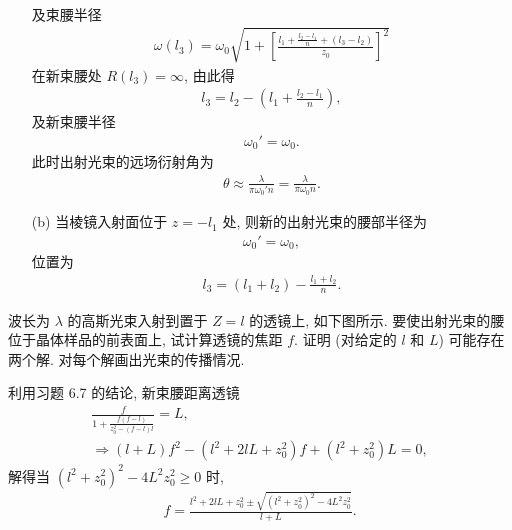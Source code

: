 \documentclass{note}
\begin{document}
\begin{sol}
\begin{itemize}
\begin{align}
        \end{align}
        及束腰半径
        \begin{align}
            \omega(l_3)=\omega_0\sqrt{1+\left[\frac{l_1+\frac{l_2-l_1}{n}+(l_3-l_2)}{z_0}\right]^2}
        \end{align}
        在新束腰处 $R(l_3)=\infty$, 由此得
        \begin{align}
            l_3=l_2-\left(l_1+\frac{l_2-l_1}{n}\right),
        \end{align}
        及新束腰半径
        \begin{align}
            \omega_0'=\omega_0.
        \end{align}
        此时出射光束的远场衍射角为
        \begin{align}
            \theta\approx\frac{\lambda}{\pi\omega_0'n}=\frac{\lambda}{\pi\omega_0n}.
        \end{align}
        \item[(b)] 当棱镜入射面位于 $z=-l_1$ 处, 则新的出射光束的腰部半径为
        \begin{align}
            \omega_0'=\omega_0,
        \end{align}
        位置为
        \begin{align}
            l_3=(l_1+l_2)-\frac{l_1+l_2}{n}.
        \end{align}
    \end{itemize}
\end{sol}

\begin{exe}
    波长为 $\lambda$ 的高斯光束入射到置于 $Z=l$ 的透镜上, 如下图所示.
    要使出射光束的腰位于晶体样品的前表面上, 试计算透镜的焦距 $f$. 证明 (对给定的 $l$ 和 $L$) 可能存在两个解. 对每个解画出光束的传播情况.
\end{exe}
\begin{pf}
    利用习题 6.7  的结论, 新束腰距离透镜
    \begin{gather}
        \frac{f}{1+\frac{f(f-l)}{z_0^2-(f-l)l}}=L,\\
        \Longrightarrow(l+L)f^2-(l^2+2lL+z_0^2)f+(l^2+z_0^2)L=0,
    \end{gather}
    解得当 $(l^2+z_0^2)^2-4L^2z_0^2\geq 0$ 时,
    \begin{align}
        f=\frac{l^2+2lL+z_0^2\pm\sqrt{(l^2+z_0^2)^2-4L^2z_0^2}}{l+L}.
    \end{align}
\end{pf}
\end{document}
